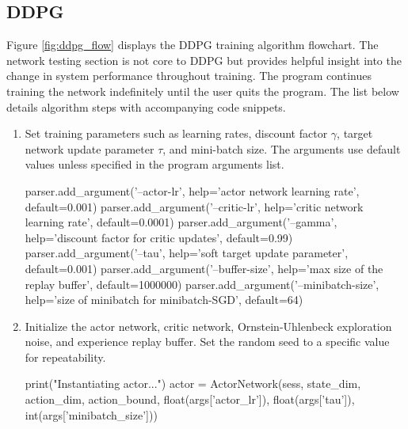 \subsection{DDPG}
Figure \ref{fig:ddpg_flow} displays the DDPG training algorithm flowchart. The network testing section is not core to DDPG but provides helpful insight into the change in system performance throughout training. The program continues training the network indefinitely until the user quits the program. The list below details algorithm steps with accompanying code snippets.
\begin{enumerate}
\item Set training parameters such as learning rates, discount factor $\gamma$, target network update parameter $\tau$, and mini-batch size. The arguments use default values unless specified in the program arguments list.
\begin{python}[caption={Training Parameter Initialization},label={list:train_param_init},xleftmargin=\dimexpr-\csname @totalleftmargin\endcsname]
parser.add_argument('--actor-lr', help='actor network learning rate', default=0.001) 
parser.add_argument('--critic-lr', help='critic network learning rate', default=0.0001) 
parser.add_argument('--gamma', help='discount factor for critic updates', default=0.99) 
parser.add_argument('--tau', help='soft target update parameter', default=0.001) 
parser.add_argument('--buffer-size', help='max size of the replay buffer', default=1000000)
parser.add_argument('--minibatch-size', help='size of minibatch for minibatch-SGD', default=64)
\end{python}
\item Initialize the actor network, critic network, Ornstein-Uhlenbeck exploration noise, and experience replay buffer. Set the random seed to a specific value for repeatability.
\begin{python}[caption={Network, Noise, and Experience Replay Buffer Initialization},label={list:net_init},xleftmargin=\dimexpr-\csname @totalleftmargin\endcsname]
print("Instantiating actor...")
actor = ActorNetwork(sess, state_dim, action_dim, action_bound,
                     float(args['actor_lr']), float(args['tau']),
                     int(args['minibatch_size']))


\end{python}
\end{enumerate}
